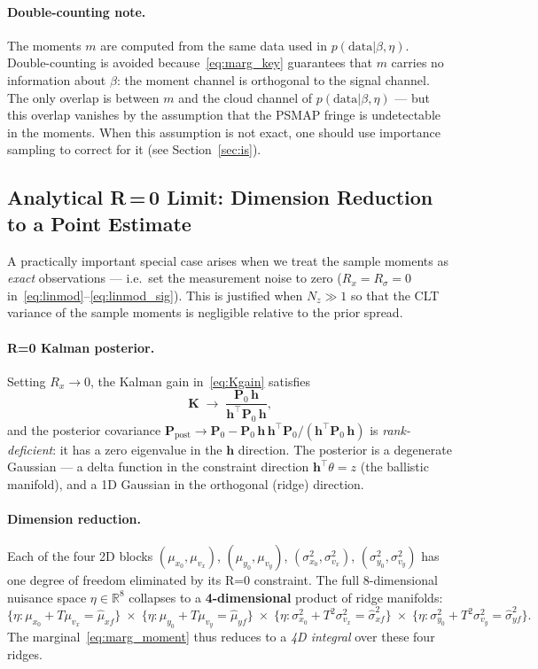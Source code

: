 \documentclass[11pt,a4paper]{article}
\begin{document}
\paragraph{Double-counting note.}
The moments $m$ are computed from the same data used in $p(\text{data}|\beta,\eta)$.
Double-counting is avoided because~\eqref{eq:marg_key} guarantees that $m$
carries no information about $\beta$: the moment channel is orthogonal to
the signal channel.  The only overlap is between $m$ and the cloud channel
of $p(\text{data}|\beta,\eta)$ — but this overlap vanishes by the
assumption that the PSMAP fringe is undetectable in the moments.  When this
assumption is not exact, one should use importance sampling to correct for
it (see Section~\ref{sec:is}).

\subsection{Analytical R\,=\,0 Limit: Dimension Reduction to a Point Estimate}
\label{sec:r0}

A practically important special case arises when we treat the sample moments
as \emph{exact} observations — i.e.\ set the measurement noise to zero
($R_x = R_\sigma = 0$ in~\eqref{eq:linmod}--\eqref{eq:linmod_sig}).
This is justified when $N_z \gg 1$ so that the CLT variance of the sample
moments is negligible relative to the prior spread.

\paragraph{R=0 Kalman posterior.}
Setting $R_x \to 0$, the Kalman gain in~\eqref{eq:Kgain} satisfies
\[
  \mathbf{K} \;\to\; \frac{\mathbf{P}_0\,\mathbf{h}}{\mathbf{h}^\top\mathbf{P}_0\,\mathbf{h}},
\]
and the posterior covariance $\mathbf{P}_\mathrm{post} \to \mathbf{P}_0 -
\mathbf{P}_0\,\mathbf{h}\,\mathbf{h}^\top\mathbf{P}_0 / (\mathbf{h}^\top\mathbf{P}_0\,\mathbf{h})$
is \emph{rank-deficient}: it has a zero eigenvalue in the $\mathbf{h}$ direction.
The posterior is a degenerate Gaussian — a delta function in the constraint direction
$\mathbf{h}^\top\theta = z$ (the ballistic manifold), and a 1D Gaussian in the
orthogonal (ridge) direction.

\paragraph{Dimension reduction.}
Each of the four 2D blocks
$(\mu_{x_0}, \mu_{v_x})$, $(\mu_{y_0}, \mu_{v_y})$,
$(\sigma^2_{x_0}, \sigma^2_{v_x})$, $(\sigma^2_{y_0}, \sigma^2_{v_y})$
has one degree of freedom eliminated by its R=0 constraint.  The full
8-dimensional nuisance space $\eta \in \mathbb{R}^8$ collapses to a
\textbf{4-dimensional} product of ridge manifolds:
\begin{equation}
  \{\eta : \mu_{x_0}+T\mu_{v_x} = \hat\mu_{xf}\}
  \;\times\;
  \{\eta : \mu_{y_0}+T\mu_{v_y} = \hat\mu_{yf}\}
  \;\times\;
  \{\eta : \sigma^2_{x_0}+T^2\sigma^2_{v_x} = \hat\sigma^2_{xf}\}
  \;\times\;
  \{\eta : \sigma^2_{y_0}+T^2\sigma^2_{v_y} = \hat\sigma^2_{yf}\}.
  \label{eq:ridge4d}
\end{equation}
The marginal~\eqref{eq:marg_moment} thus reduces to a \emph{4D integral}
over these four ridges.
\end{document}
